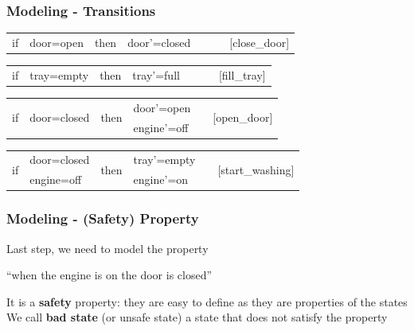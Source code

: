 \begin{frame}
  \frametitle{Modeling - Transitions}

  \scriptsize

  \begin{tabular}{llllcl}
    if & door=open  & then & door'=closed & ~~~ & [close\_door]
  \end{tabular}

  \begin{center}
  \scalebox{.85}{}
  \end{center}
  \pause

  \begin{tabular}{llllcl}
    if & tray=empty  & then & tray'=full & ~~~ & [fill\_tray]
  \end{tabular}

  \begin{center}
  \scalebox{.85}{}
  \end{center}
  \pause

  \begin{tabular}{llllcl}
    \multirow{2}{*}{if} & \multirow{2}{*}{door=closed} & \multirow{2}{*}{then} & door'=open  & & \multirow{2}{*}{[open\_door]} \\ 
                        &                              &                       & engine'=off & &                             \\
  \end{tabular}

  \begin{center}
  \scalebox{.85}{}
  \end{center}
  \pause

  \begin{tabular}{llllcl}
    \multirow{2}{*}{if} & door=closed & \multirow{2}{*}{then} & tray'=empty & & \multirow{2}{*}{[start\_washing]} \\ 
                        & engine=off  &                       & engine'=on  & &                                   \\
  \end{tabular}

  \begin{center}
  \scalebox{.85}{}
  \end{center}

\end{frame}

\begin{frame}
  \frametitle{Modeling - (Safety) Property}

  Last step, we need to model the property
  \begin{center}
    ``when the engine is on the door is closed'' 
  \end{center}
  It is a {\bf safety} property: they are easy
  to define as they are properties of the states
  \vfill\pause
  We call {\bf bad state} (or unsafe state) a state 
  that does not satisfy the property
  \vfill
  \begin{center}
  
  \end{center}

\end{frame}
